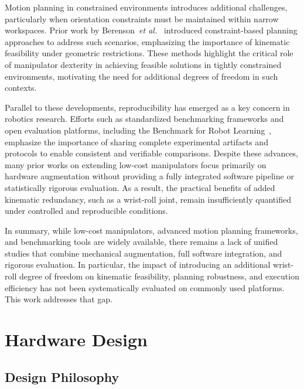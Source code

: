 \documentclass[conference]{IEEEtran}
\begin{document}
	Motion planning in constrained environments introduces additional
	challenges, particularly when orientation constraints must be maintained
	within narrow workspaces. Prior work by Berenson~\textit{et al.}~\cite{berenson2011task}
	introduced constraint-based planning approaches to address such
	scenarios, emphasizing the importance of kinematic feasibility under
	geometric restrictions. These methods highlight the critical role of
	manipulator dexterity in achieving feasible solutions in tightly
	constrained environments, motivating the need for additional degrees of
	freedom in such contexts.
	
	Parallel to these developments, reproducibility has emerged as a key
	concern in robotics research. Efforts such as standardized benchmarking
	frameworks and open evaluation platforms, including the Benchmark for
	Robot Learning~\cite{benchmarkrobotlearning}, emphasize the importance
	of sharing complete experimental artifacts and protocols to enable
	consistent and verifiable comparisons. Despite these advances, many
	prior works on extending low-cost manipulators focus primarily on
	hardware augmentation without providing a fully integrated software
	pipeline or statistically rigorous evaluation. As a result, the
	practical benefits of added kinematic redundancy, such as a wrist-roll
	joint, remain insufficiently quantified under controlled and
	reproducible conditions.
	
	In summary, while low-cost manipulators, advanced motion planning
	frameworks, and benchmarking tools are widely available, there remains
	a lack of unified studies that combine mechanical augmentation, full
	software integration, and rigorous evaluation. In particular, the
	impact of introducing an additional wrist-roll degree of freedom on
	kinematic feasibility, planning robustness, and execution efficiency
	has not been systematically evaluated on commonly used platforms. This
	work addresses that gap.
	
	
	\section{Hardware Design}
	\label{sec:hardware}
	
	\subsection{Design Philosophy}
	
\end{document}
